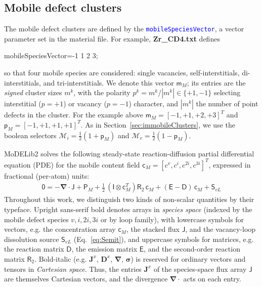 \documentclass{article}
\newcommand{\textttclr}[1]{\textcolor{blue}{\texttt{#1}}}
\newcommand{\spvec}[1]{\bm{\mathsf{#1}}}   %
\newcommand{\spmat}[1]{\bm{\mathsf{#1}}}   %
\begin{document}
\subsection{Mobile defect clusters}
The mobile defect clusters are defined by the \textttclr{mobileSpeciesVector}, a vector parameter set in the material file. For example, \textbf{Zr\_CD4.txt} defines
   \begin{commandshell}
    mobileSpeciesVector=-1 1 2 3;	
    \end{commandshell}
\noindent so that four mobile species are considered: single vacancies, self-interstitials, di-interstitials, and tri-interstitials. We denote this vector $\spvec{m}_M$; its entries are the \emph{signed} cluster sizes $m^k$, with the polarity $p^k=m^k/|m^k|\in\{+1,-1\}$ selecting interstitial ($p=+1$) or vacancy ($p=-1$) character, and $|m^k|$ the number of point defects in the cluster. For the example above $\spvec{m}_M=[-1,+1,+2,+3]^T$ and $\spvec{p}_M=[-1,+1,+1,+1]^T$. As in Section~\ref{sec:immobileClusters}, we use the boolean selectors $\mathcal{M}_i=\tfrac12(1+\spvec{p}_M)$ and $\mathcal{M}_v=\tfrac12(1-\spvec{p}_M)$.


MoDELib2 solves the following steady-state reaction-diffusion partial differential equation (PDE) for the mobile content field $\spvec{c}_M=[c^v,c^i,c^{2i},c^{3i}]^T$, expressed in fractional (per-atom) units:
\begin{align}
\label{Eq:master_c}
    \spvec{0} = - \bm \nabla \cdot
\spvec{J}
+ \spvec{P}_{M}+\tfrac{1}{2}\,(\spmat{I}\otimes\spvec{c}_M^T)\spmat{R}_2\,\spvec{c}_{M}
+ (\spmat{E}-\spmat{D})\,\spvec{c}_{M}+\spvec{S}_{vL}
\end{align}
Throughout this work, we distinguish two kinds of non-scalar quantities by their typeface. Upright sans-serif bold denotes arrays in \emph{species space} (indexed by the mobile defect species $v,i,2i,3i$ or by loop family), with lowercase symbols for vectors, e.g. the concentration array $\spvec{c}_M$, the stacked flux $\spvec{J}$, and the vacancy-loop dissolution source $\spvec{S}_{vL}$ (Eq.~\ref{eq:Semit}), and uppercase symbols for matrices, e.g. the reaction matrix $\spmat{D}$, the emission matrix $\spmat{E}$, and the second-order reaction matrix $\spmat{R}_2$. Bold-italic (e.g. $\bm J^x$, $\bm D^x$, $\bm\nabla$, $\bm\sigma$) is reserved for ordinary vectors and tensors in \emph{Cartesian space}. Thus, the entries $\bm J^x$ of the species-space flux array $\spvec{J}$ are themselves Cartesian vectors, and the divergence $\bm\nabla\cdot$ acts on each entry.
\end{document}
